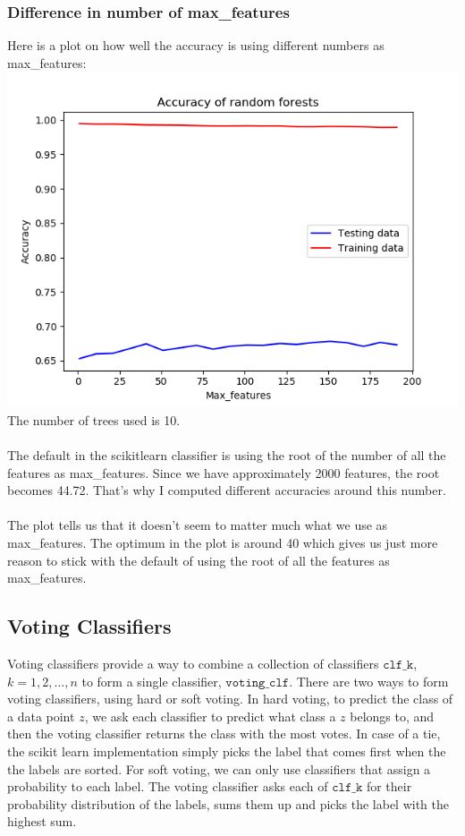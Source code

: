\documentclass[parskip=half]{scrartcl}
\theoremstyle{definition}
\theoremstyle{remark}
\newcommand{\varname}[1]{\texttt{#1}}
\begin{document}
\subsubsection{Difference in number of max\_features}
Here is a plot on how well the accuracy is using different numbers as max\_features:\\
\includegraphics[scale=.7]{images/Max_featuresplot}\\
The number of trees used is 10.\\
\\
The default in the scikitlearn classifier is using the root of the number of all the features as max\_features. Since we have approximately 2000 features, the root becomes 44.72. That's why I computed different accuracies around this number.\\
\\
The plot tells us that it doesn't seem to matter much what we use as max\_features. The optimum in the plot is around 40 which gives us just more reason to stick with the default of using the root of all the features as max\_features.

\subsection{Voting Classifiers}

Voting classifiers provide a way to combine a collection of classifiers $\varname{clf\_k}$, $k=1,2,\ldots,n$ to form a single classifier, $\varname{voting\_clf}$. 
There are two ways to form voting classifiers, using hard or soft voting. 
In hard voting, to predict the class of a data point $z$, we ask each classifier to predict what class a $z$ belongs to, and then the voting classifier returns the class with the most votes. 
In case of a tie, the scikit learn implementation simply picks the label that comes first when the the labels are sorted. 
For soft voting, we can only use classifiers that assign a probability to each label. 
The voting classifier asks each of $\varname{clf\_k}$ for their probability distribution of the labels, sums them up and picks the label with the highest sum. 
\end{document}

